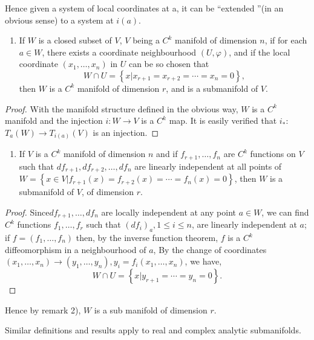 Hence given a system of local coordinates at a, it can be ``extended
''(in an obvious sense) to a system at $i(a)$. 
\begin{enumerate}[2.]
\item If  $W$ is a closed subset of $V$, $V$ being a $C^k$ manifold of
  dimension $n$, if for each $a \in W$, there exists a coordinate
  neighbourhood $(U, \varphi)$, and if the local coordinate $(x_1,
  \ldots , x_n)$ in $U$ can be so chosen that  
  $$
  W \cap U = \left\{ x \bigg| x_{r+1} = x_{r+2}= \cdots = x_n = 0 \right\},
  $$
  then $W$ is  a $C^k$ manifold of dimension $r$, and is a submanifold of $V$.
\end{enumerate}

\begin{proof}
With the manifold structure defined in the obvious way, $W$ is a
$C^k$ manifold and the injection $i : W \to V$ is a $C^k$ map. It is
easily verified that $i_*$: $T_a (W)  \to T_{i (a)}(V)$ is an
injection. 
\end{proof} 

\begin{enumerate}[3]
\item If $V$ is a $C^k$ manifold of dimension $n$ and if  $f_{r+1},
  \ldots , f_n$ are $C^k$ functions on $V$ such that $df_{r+1}, df_{r+2}, \ldots
  , df_n$ are linearly independent at all points of  $W = \left\{ x
  \in V \bigg| f_{r+1} (x) = f_{r+2} (x) = \cdots = f_n (x) =0
  \right\}$, then $W$ is a submanifold of $V$, of dimension $r$. 
\end{enumerate}
 
\begin{proof}
  Since\pageoriginale $df_{r+1}, \ldots , df_n$ are locally independent at any point
  $a \in W$, we can find $C^k$ functions $f_1 , \ldots , f_r$ such
  that $(df_i)_a , 1 \le i \le n$,  are linearly independent at $a$;
  if $f= (f_1, \ldots , f_n)$ then, by the inverse function theorem,
  $f$ is a $C^k$ diffeomorphism in a neighbourhood of $a$, By the
  change of coordinates $(x_1,  \ldots ,  x_n) \to (y_1 , \ldots ,
  y_n), y_i = f_i (x_1,  \ldots , x_n)$, we have, 
  $$
  W \cap U = \left\{ x \bigg|  y_{r+1} = \cdots =  y_n  =  0\right\}.
  $$ 
\end{proof} 
 
Hence by remark 2), $W$ is a sub manifold of dimension $r$.
\begin{remark*}
  Similar definitions and results apply to real and complex analytic
  submanifolds. 
\end{remark*} 

